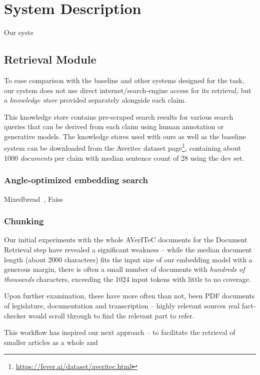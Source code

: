 
\section{System Description}
\label{sec:system}
Our syste

\subsection{Retrieval Module}
To ease comparison with the baseline and other systems designed for the task, our system does not use direct internet/search-engine access for its retrieval, but a \textit{knowledge store} provided separately alongside each claim.

This knowledge store contains pre-scraped search results for various search queries that can be derived from each claim using human annotation or generative models.
The knowledge stores used with ours as well as the baseline system can be downloaded from the Averitec dataset page\footnote{\url{https://fever.ai/dataset/averitec.html}}, containing about 1000 \textit{documents} per claim with median sentence count of 28 using the dev set.

\subsubsection{Angle-optimized embedding search}
Mixedbread~\cite{li-li-2024-aoe,emb2024mxbai}, Faiss~\cite{douze2024faiss,johnson2019billion}

\subsubsection{Chunking}
Our initial experiments with the whole AVerITeC documents for the Document Retrieval step have revealed a significant weakness -- while the median document length (about 2000 characters) fits the input size of our embedding model with a generous margin, there is often a small number of documents with \textit{hundreds of thousands} characters, exceeding the 1024 input tokens with little to no coverage.

Upon further examination, these have more often than not, been PDF documents of legislature, documentation and transcription -- highly relevant sources real fact-checker would scroll through to find the relevant part to refer. 

This workflow has inspired our next approach -- to facilitate the retrieval of smaller articles as a whole and 

